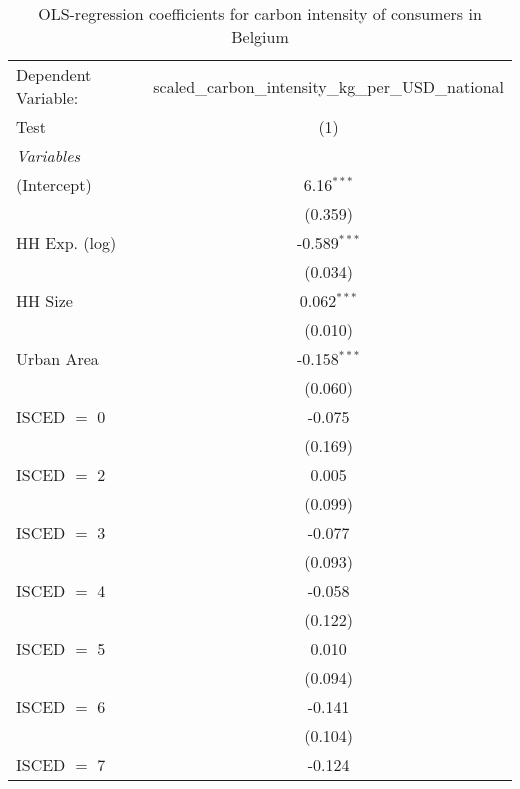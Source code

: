 
\begin{table}[htbp!]
   \centering
   \small
   \begin{adjustbox}{width = 1\textwidth, max height = 0.95\textheight, center}
      \begin{threeparttable}[b]
         \caption{\label{tab:OLS_1_BEL} OLS-regression coefficients for carbon intensity of consumers in Belgium}
         \begin{tabular}{lc}
            \tabularnewline \midrule \midrule
            Dependent Variable: & scaled\_carbon\_intensity\_kg\_per\_USD\_national\\        
            Test                & (1)\\  
            \midrule
            \emph{Variables}\\
            (Intercept)         & 6.16$^{***}$\\   
                                & (0.359)\\   
            HH Exp. (log)       & -0.589$^{***}$\\   
                                & (0.034)\\   
            HH Size             & 0.062$^{***}$\\   
                                & (0.010)\\   
            Urban Area          & -0.158$^{***}$\\   
                                & (0.060)\\   
            ISCED $=$ 0         & -0.075\\   
                                & (0.169)\\   
            ISCED $=$ 2         & 0.005\\   
                                & (0.099)\\   
            ISCED $=$ 3         & -0.077\\   
                                & (0.093)\\   
            ISCED $=$ 4         & -0.058\\   
                                & (0.122)\\   
            ISCED $=$ 5         & 0.010\\   
                                & (0.094)\\   
            ISCED $=$ 6         & -0.141\\   
                                & (0.104)\\   
            ISCED $=$ 7         & -0.124\\   

\end{tabular}
\end{threeparttable}
\end{adjustbox}
\end{table}
